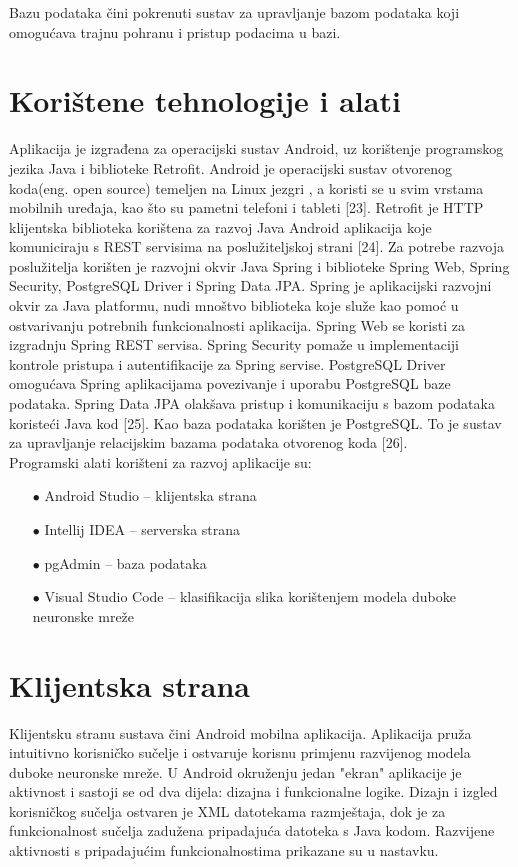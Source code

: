 \documentclass[times, utf8, zavrsni]{fer}
\begin{document}
Bazu podataka čini pokrenuti sustav za upravljanje bazom podataka  koji omogućava trajnu pohranu i pristup podacima u bazi. 
\newpage

\section{Korištene tehnologije i alati}
Aplikacija je izgrađena za operacijski sustav Android, uz korištenje programskog jezika Java i biblioteke Retrofit. Android je operacijski sustav otvorenog koda(eng. open source) temeljen na Linux jezgri , a koristi se u svim vrstama mobilnih uređaja, kao što su pametni telefoni i tableti [23]. Retrofit je HTTP klijentska biblioteka korištena za razvoj Java Android aplikacija koje komuniciraju s REST servisima na poslužiteljskoj strani [24]. Za potrebe razvoja poslužitelja korišten je razvojni okvir  Java Spring i biblioteke Spring Web, Spring Security, PostgreSQL Driver i Spring Data JPA. Spring je aplikacijski razvojni okvir za Java platformu, nudi mnoštvo biblioteka koje služe kao pomoć u ostvarivanju potrebnih funkcionalnosti aplikacija. Spring Web se koristi za izgradnju Spring REST servisa. Spring Security pomaže u implementaciji kontrole pristupa i autentifikacije za Spring servise. PostgreSQL Driver omogućava Spring aplikacijama povezivanje i uporabu PostgreSQL baze podataka. Spring Data JPA olakšava pristup i komunikaciju s bazom podataka koristeći Java kod [25]. Kao baza podataka korišten je PostgreSQL. To je sustav za upravljanje relacijskim bazama podataka  otvorenog koda [26].\\
%
Programski alati korišteni za razvoj aplikacije su:
\begin{itemize}
\item[$\bullet$] Android Studio -- klijentska strana
\item[$\bullet$] Intellij IDEA -- serverska strana 
\item[$\bullet$] pgAdmin -- baza podataka
\item[$\bullet$] Visual Studio Code -- klasifikacija slika korištenjem modela duboke neuronske mreže
\end{itemize}

\section{Klijentska strana}
Klijentsku stranu sustava čini Android mobilna aplikacija. Aplikacija pruža intuitivno korisničko sučelje i ostvaruje korisnu primjenu razvijenog modela duboke neuronske mreže. U Android okruženju jedan "ekran" aplikacije je aktivnost  i sastoji se od dva dijela: dizajna i funkcionalne logike. Dizajn i izgled korisničkog sučelja ostvaren je XML datotekama razmještaja, dok je za funkcionalnost sučelja zadužena pripadajuća datoteka s Java kodom. Razvijene aktivnosti s pripadajućim funkcionalnostima prikazane su u nastavku.\\
\end{document}
